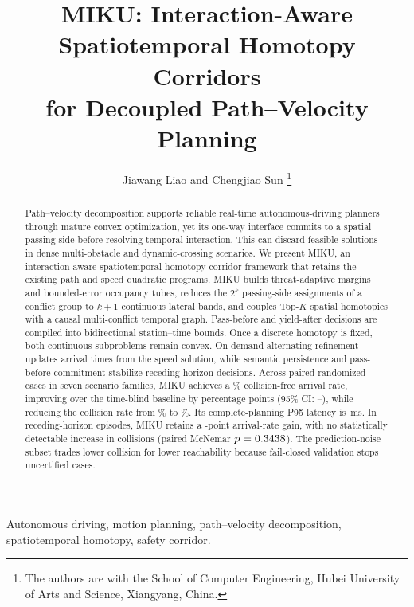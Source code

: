 \documentclass[journal,10pt]{IEEEtran}
\title{MIKU: Interaction-Aware Spatiotemporal Homotopy Corridors\\for Decoupled Path--Velocity Planning}
\author{Jiawang Liao and Chengjiao Sun%
\thanks{The authors are with the School of Computer Engineering, Hubei University of Arts and Science, Xiangyang, China.}
}
\begin{document}
\maketitle

\begin{abstract}
Path--velocity decomposition supports reliable real-time autonomous-driving planners through mature convex optimization, yet its one-way interface commits to a spatial passing side before resolving temporal interaction. This can discard feasible solutions in dense multi-obstacle and dynamic-crossing scenarios. We present MIKU, an interaction-aware spatiotemporal homotopy-corridor framework that retains the existing path and speed quadratic programs. MIKU builds threat-adaptive margins and bounded-error occupancy tubes, reduces the $2^k$ passing-side assignments of a conflict group to $k+1$ continuous lateral bands, and couples Top-$K$ spatial homotopies with a causal multi-conflict temporal graph. Pass-before and yield-after decisions are compiled into bidirectional station--time bounds. Once a discrete homotopy is fixed, both continuous subproblems remain convex. On-demand alternating refinement updates arrival times from the speed solution, while semantic persistence and pass-before commitment stabilize receding-horizon decisions. Across \RandCaseCount{} paired randomized cases in seven scenario families, MIKU achieves a \RandAllMikuSuccessPct\% collision-free arrival rate, improving over the time-blind baseline by \RandAllMikuVsBZeroSuccessDiff{} percentage points (95\% CI: \RandAllMikuVsBZeroSuccessCiLow--\RandAllMikuVsBZeroSuccessCiHigh), while reducing the collision rate from \RandAllBZeroCollisionPct\% to \RandAllMikuCollisionPct\%. Its complete-planning P95 latency is \RandAllMikuRuntimePninetyfive\,ms. In \ClosedCaseCount{} receding-horizon episodes, MIKU retains a \ClosedMikuVsBZeroSuccessDiff-point arrival-rate gain, with no statistically detectable increase in collisions (paired McNemar $p=0.3438$). The prediction-noise subset trades lower collision for lower reachability because fail-closed validation stops uncertified cases.
\end{abstract}

\begin{IEEEkeywords}
Autonomous driving, motion planning, path--velocity decomposition, spatiotemporal homotopy, safety corridor.
\end{IEEEkeywords}


\printbibliography
\end{document}
